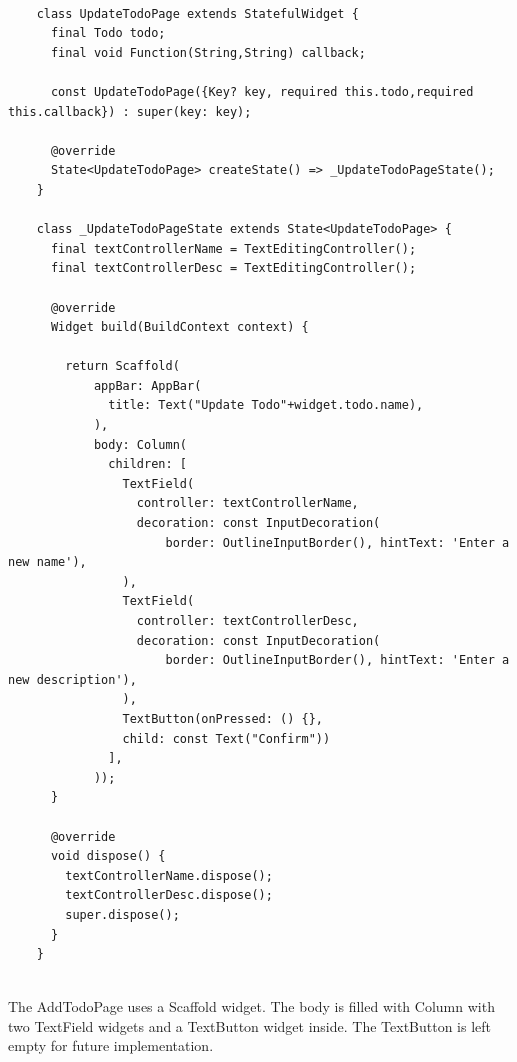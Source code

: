 	\mbox{}\\
	\begin{code}
	 \mbox{}
			\label{code:2.7}
	\begin{verbatim}
	class UpdateTodoPage extends StatefulWidget {
	  final Todo todo;
	  final void Function(String,String) callback;
	
	  const UpdateTodoPage({Key? key, required this.todo,required this.callback}) : super(key: key);
	
	  @override
	  State<UpdateTodoPage> createState() => _UpdateTodoPageState();
	}
	
	class _UpdateTodoPageState extends State<UpdateTodoPage> {
	  final textControllerName = TextEditingController();
	  final textControllerDesc = TextEditingController();
	
	  @override
	  Widget build(BuildContext context) {
	
	    return Scaffold(
	        appBar: AppBar(
	          title: Text("Update Todo"+widget.todo.name),
	        ),
	        body: Column(
	          children: [
	            TextField(
	              controller: textControllerName,
	              decoration: const InputDecoration(
	                  border: OutlineInputBorder(), hintText: 'Enter a new name'),
	            ),
	            TextField(
	              controller: textControllerDesc,
	              decoration: const InputDecoration(
	                  border: OutlineInputBorder(), hintText: 'Enter a new description'),
	            ),
	            TextButton(onPressed: () {},
	            child: const Text("Confirm"))
	          ],
	        ));
	  }
	
	  @override
	  void dispose() {
	    textControllerName.dispose();
	    textControllerDesc.dispose();
	    super.dispose();
	  }
	}
	
	\end{verbatim}
	\end{code}
	\mbox{}
	
	
	
	The AddTodoPage uses a Scaffold widget. The body is filled with Column with two TextField widgets and a TextButton widget inside. The TextButton is left empty for future implementation.
	
